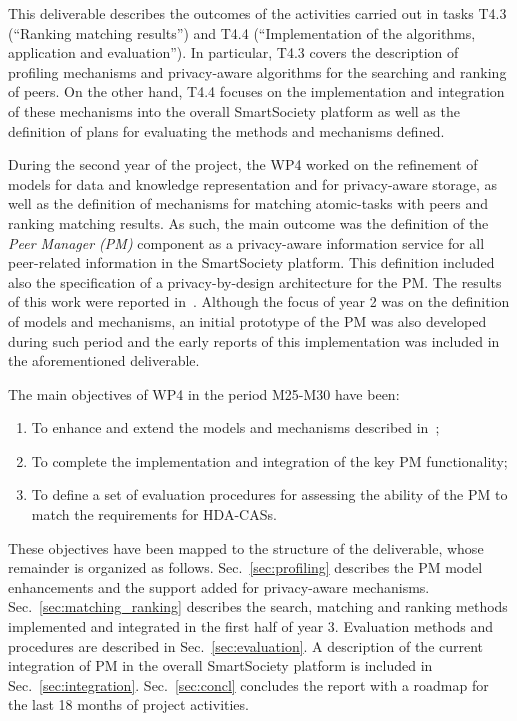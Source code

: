 This deliverable describes the outcomes of the activities carried out in tasks T4.3 (``Ranking matching results'') and T4.4 (``Implementation of the algorithms, application and evaluation''). In particular, T4.3 covers the description of profiling mechanisms and privacy-aware algorithms  %
for the searching and ranking of peers. On the other hand, T4.4 focuses on the implementation and integration of these mechanisms into the overall SmartSociety platform as well as the definition of plans for evaluating the methods and mechanisms defined.

During the second year of the project, the WP4 worked on the refinement of models for data and knowledge representation and for privacy-aware storage, as well as the definition of mechanisms for matching atomic-tasks with peers and ranking matching results. 
As such, the main outcome was the definition of the \emph{Peer Manager (PM)} component as a privacy-aware information service for all peer-related information in the SmartSociety platform. This definition included also the specification of a privacy-by-design architecture for the PM. The results of this work were reported in~\cite{D4.2}.
Although the focus of year 2 was on the definition of models and mechanisms, an initial prototype of the PM was also developed during such period and the early reports of this implementation was included in the aforementioned deliverable. 

The main objectives of WP4 in the period M25-M30 have been:
\begin{enumerate}
\item To enhance and extend the models and mechanisms described in~\cite{D4.2};
\item To complete the implementation and integration of the key PM functionality;
\item To define a set of evaluation procedures for assessing the ability of the PM to match the requirements for HDA-CASs. 
\end{enumerate}


These objectives have been mapped to the structure of the deliverable, whose remainder is organized as follows. Sec.~\ref{sec:profiling} describes the PM model enhancements and the support added for privacy-aware mechanisms. Sec.~\ref{sec:matching_ranking} describes the search, matching and ranking methods implemented and integrated in the first half of year 3. Evaluation methods and procedures are described in Sec.~\ref{sec:evaluation}. A description of the current integration of PM in the overall SmartSociety platform is included in Sec.~\ref{sec:integration}. Sec.~\ref{sec:concl} concludes the report with a roadmap for the last 18 months of project activities.